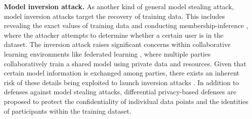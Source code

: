     \textbf{Model inversion attack.}  As another kind of general model stealing attack, model inversion attacks target the recovery of training data.
    This includes revealing the exact values of training data \citep{fredrikson2014privacy, fredrikson2015model} and conducting membership-inference \citep{shokri2017membership}, where the attacker attempts to determine whether a certain user is in the dataset.
    The inversion attack raises significant concerns within collaborative learning environments like federated learning \citep{konevcny2016federated,mcmahan2017communication,HeteroFL,FLOutlook}, where multiple parties collaboratively train a shared model using private data and resources. Given that certain model information is exchanged among parties, there exists an inherent risk of these details being exploited to launch inversion attacks \citep{zhu2019deep,geiping2020inverting,geng2023improved}.
    In addition to defenses against model stealing attacks, differential privacy-based defenses \citep{park2019attack, stock2022defending} are proposed to protect the confidentiality of individual data points and the identities of participants within the training dataset. 



